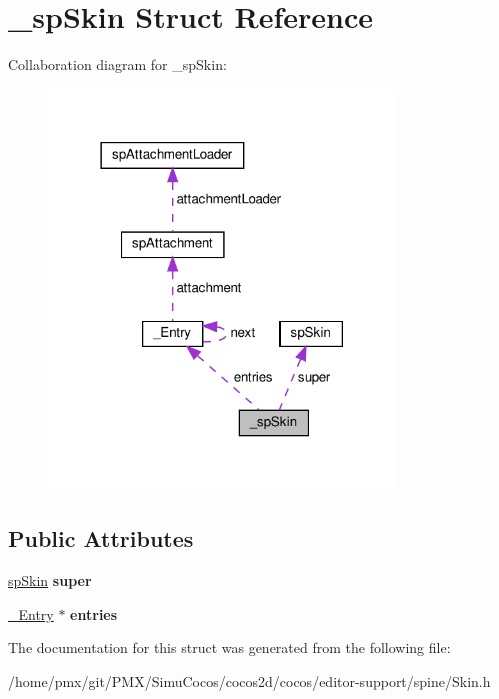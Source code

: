 \hypertarget{struct__spSkin}{}\section{\+\_\+sp\+Skin Struct Reference}
\label{struct__spSkin}


Collaboration diagram for \+\_\+sp\+Skin\+:
\nopagebreak
\begin{figure}[H]
\begin{center}
\leavevmode
\includegraphics[width=261pt]{struct__spSkin__coll__graph}
\end{center}
\end{figure}
\subsection*{Public Attributes}
\begin{DoxyCompactItemize}
\item 
\mbox{\label{struct__spSkin_a03d3dba51373c7e4a42ec7f996f57f92}} 
\hyperlink{structspSkin}{sp\+Skin} {\bfseries super}
\item 
\mbox{\label{struct__spSkin_ad70a5dffe7e3a814a4bba2fa08bc3e50}} 
\hyperlink{struct__Entry}{\+\_\+\+Entry} $\ast$ {\bfseries entries}
\end{DoxyCompactItemize}


The documentation for this struct was generated from the following file\+:\begin{DoxyCompactItemize}
\item 
/home/pmx/git/\+P\+M\+X/\+Simu\+Cocos/cocos2d/cocos/editor-\/support/spine/Skin.\+h\end{DoxyCompactItemize}
